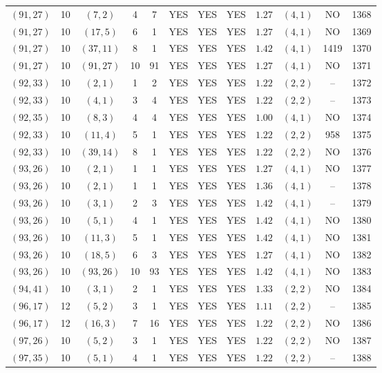 \begin{longtable}{|c|c|c|c|c|c|c|c|c|c|c|c|}
$(91,27)$ & 10 & $(7,2)$ & 4 & 7 & YES & YES & YES & $1.27$ & $(4,1)$ & NO & 1368\\
$(91,27)$ & 10 & $(17,5)$ & 6 & 1 & YES & YES & YES & $1.27$ & $(4,1)$ & NO & 1369\\
$(91,27)$ & 10 & $(37,11)$ & 8 & 1 & YES & YES & YES & $1.42$ & $(4,1)$ & 1419 & 1370\\
$(91,27)$ & 10 & $(91,27)$ & 10 & 91 & YES & YES & YES & $1.27$ & $(4,1)$ & NO & 1371\\
$(92,33)$ & 10 & $(2,1)$ & 1 & 2 & YES & YES & YES & $1.22$ & $(2,2)$ & -- & 1372\\
$(92,33)$ & 10 & $(4,1)$ & 3 & 4 & YES & YES & YES & $1.22$ & $(2,2)$ & -- & 1373\\
$(92,35)$ & 10 & $(8,3)$ & 4 & 4 & YES & YES & YES & $1.00$ & $(4,1)$ & NO & 1374\\
$(92,33)$ & 10 & $(11,4)$ & 5 & 1 & YES & YES & YES & $1.22$ & $(2,2)$ & 958 & 1375\\
$(92,33)$ & 10 & $(39,14)$ & 8 & 1 & YES & YES & YES & $1.22$ & $(2,2)$ & NO & 1376\\
$(93,26)$ & 10 & $(2,1)$ & 1 & 1 & YES & YES & YES & $1.27$ & $(4,1)$ & NO & 1377\\
$(93,26)$ & 10 & $(2,1)$ & 1 & 1 & YES & YES & YES & $1.36$ & $(4,1)$ & -- & 1378\\
$(93,26)$ & 10 & $(3,1)$ & 2 & 3 & YES & YES & YES & $1.42$ & $(4,1)$ & -- & 1379\\
$(93,26)$ & 10 & $(5,1)$ & 4 & 1 & YES & YES & YES & $1.42$ & $(4,1)$ & NO & 1380\\
$(93,26)$ & 10 & $(11,3)$ & 5 & 1 & YES & YES & YES & $1.42$ & $(4,1)$ & NO & 1381\\
$(93,26)$ & 10 & $(18,5)$ & 6 & 3 & YES & YES & YES & $1.27$ & $(4,1)$ & NO & 1382\\
$(93,26)$ & 10 & $(93,26)$ & 10 & 93 & YES & YES & YES & $1.42$ & $(4,1)$ & NO & 1383\\
$(94,41)$ & 10 & $(3,1)$ & 2 & 1 & YES & YES & YES & $1.33$ & $(2,2)$ & NO & 1384\\
$(96,17)$ & 12 & $(5,2)$ & 3 & 1 & YES & YES & YES & $1.11$ & $(2,2)$ & -- & 1385\\
$(96,17)$ & 12 & $(16,3)$ & 7 & 16 & YES & YES & YES & $1.22$ & $(2,2)$ & NO & 1386\\
$(97,26)$ & 10 & $(5,2)$ & 3 & 1 & YES & YES & YES & $1.22$ & $(2,2)$ & NO & 1387\\
$(97,35)$ & 10 & $(5,1)$ & 4 & 1 & YES & YES & YES & $1.22$ & $(2,2)$ & -- & 1388\\

\end{longtable}
